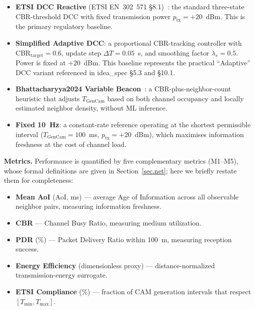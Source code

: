 \documentclass[journal]{IEEEtran}
\begin{document}
\begin{itemize}[leftmargin=2em]
  \item[\textbf{BL-A}] \textbf{ETSI DCC Reactive}
    (ETSI EN~302~571 \S8.1)~\cite{Bhattacharyya2024}: the
    standard three-state CBR-threshold DCC with fixed transmission
    power $p_{\text{tx}} = +20$~dBm.  This is the primary regulatory
    baseline.

  \item[\textbf{BL-B}] \textbf{Simplified Adaptive DCC}: a
    proportional CBR-tracking controller with
    CBR$_{\text{target}} = 0.6$, update step $\Delta T = 0.05$~s,
    and smoothing factor $\lambda_s = 0.5$.  Power is fixed at
    $+20$~dBm.  This baseline represents the practical
    ``Adaptive'' DCC variant referenced in idea\_spec \S5.3 and
    \S10.1.

  \item[\textbf{BL-C}] \textbf{Bhattacharyya2024 Variable Beacon}~\cite{Bhattacharyya2024}:
    a CBR-plus-neighbor-count heuristic that adjusts
    $T_{\text{GenCam}}$ based on both channel occupancy and locally
    estimated neighbor density, without ML inference.

  \item[\textbf{BL-D}] \textbf{Fixed 10~Hz}: a constant-rate
    reference operating at the shortest permissible interval
    ($T_{\text{GenCam}} = 100$~ms, $p_{\text{tx}} = +20$~dBm),
    which maximises information freshness at the cost of channel
    load.
\end{itemize}

\textbf{Metrics.}
Performance is quantified by five complementary metrics (M1--M5),
whose formal definitions are given in Section~\ref{sec.net}; here
we briefly restate them for completeness:
\begin{itemize}[leftmargin=2em]
  \item[M1] \textbf{Mean AoI} ($\overline{\text{AoI}}$, ms) ---
    average Age of Information across all observable neighbor pairs,
    measuring information freshness.
  \item[M2] \textbf{CBR} --- Channel Busy Ratio, measuring medium
    utilization.
  \item[M3] \textbf{PDR} (\%) --- Packet Delivery Ratio within 100~m,
    measuring reception success.
  \item[M4] \textbf{Energy Efficiency} (dimensionless proxy) ---
    distance-normalized transmission-energy surrogate.
  \item[M5] \textbf{ETSI Compliance} (\%) --- fraction of CAM
    generation intervals that respect $[T_{\min}, T_{\max}]$.
\end{itemize}
\end{document}
